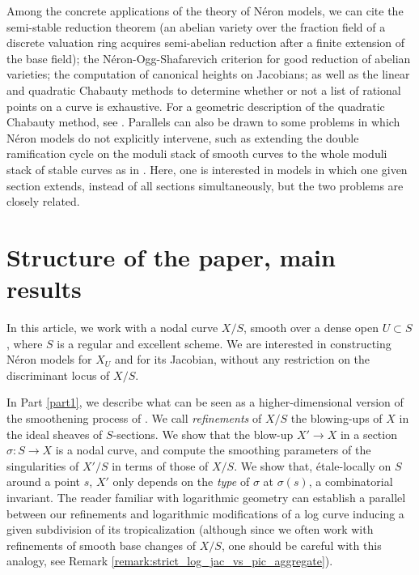 \documentclass[a4paper,10pt,twoside]{article}
\theoremstyle{definition}
\theoremstyle{remark}
\begin{document}
Among the concrete applications of the theory of N\'eron models, we can cite the semi-stable reduction theorem (an abelian variety over the fraction field of a discrete valuation ring acquires semi-abelian reduction after a finite extension of the base field); the N\'eron-Ogg-Shafarevich criterion for good reduction of abelian varieties; the computation of canonical heights on Jacobians; as well as the linear and quadratic Chabauty methods to determine whether or not a list of rational points on a curve is exhaustive. For a geometric description of the quadratic Chabauty method, see \cite{QuadChabauty}. Parallels can also be drawn to some problems in which N\'eron models do not explicitly intervene, such as extending the double ramification cycle on the moduli stack of smooth curves to the whole moduli stack of stable curves as in \cite{HolmesExtendingDRC}. Here, one is interested in models in which one given section extends, instead of all sections simultaneously, but the two problems are closely related. 

\section*{Structure of the paper, main results}

In this article, we work with a nodal curve $X/S$, smooth over a dense open $U\subset S$, where $S$ is a regular and excellent scheme. We are interested in constructing Néron models for $X_U$ and for its Jacobian, without any restriction on the discriminant locus of $X/S$.

In Part \ref{part1}, we describe what can be seen as a higher-dimensional version of the smoothening process of \cite{NeronModels}. We call \emph{refinements} of $X/S$ the blowing-ups of $X$ in the ideal sheaves of $S$-sections. We show that the blow-up $X' \to X$ in a section $\sigma\colon S \to X$ is a nodal curve, and compute the smoothing parameters of the singularities of $X'/S$ in terms of those of $X/S$. We show that, étale-locally on $S$ around a point $s$, $X'$ only depends on the \emph{type} of $\sigma$ at $\sigma(s)$, a combinatorial invariant. The reader familiar with logarithmic geometry can establish a parallel between our refinements and logarithmic modifications of a log curve inducing a given subdivision of its tropicalization (although since we often work with refinements of smooth base changes of $X/S$, one should be careful with this analogy, see Remark \ref{remark:strict_log_jac_vs_pic_aggregate}).
\end{document}
